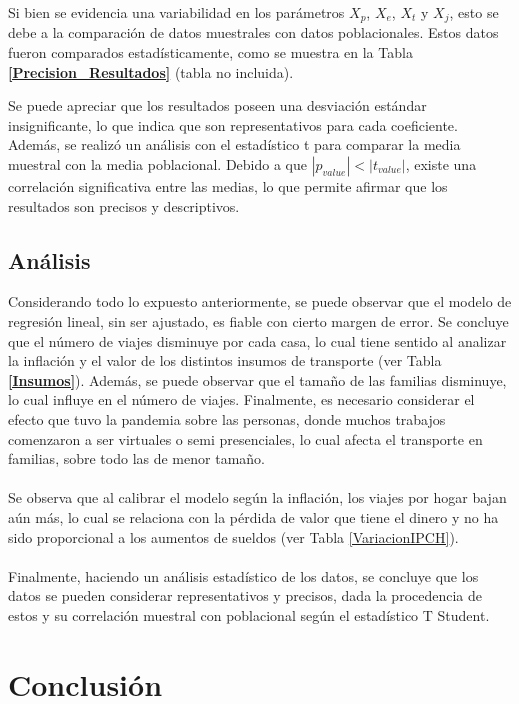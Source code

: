 \documentclass[12pt]{article} %
\begin{document}
Si bien se evidencia una variabilidad en los parámetros $X_p$, $X_e$, $X_t$ y $X_j$, esto se debe a la comparación de datos muestrales con datos poblacionales. Estos datos fueron comparados estadísticamente, como se muestra en la Tabla \textbf{\ref{Precision_Resultados}} (tabla no incluida).

Se puede apreciar que los resultados poseen una desviación estándar insignificante, lo que indica que son representativos para cada coeficiente. Además, se realizó un análisis con el estadístico t para comparar la media muestral con la media poblacional. Debido a que \(|p_{value}| < |t_{value}|\), existe una correlación significativa entre las medias, lo que permite afirmar que los resultados son precisos y descriptivos.

\subsection{Análisis}

Considerando todo lo expuesto anteriormente, se puede observar que el modelo de regresión lineal, sin ser ajustado, es fiable con cierto margen de error. Se concluye que el número de viajes disminuye por cada casa, lo cual tiene sentido al analizar la inflación y el valor de los distintos insumos de transporte (ver Tabla \textbf{\ref{Insumos}}). Además, se puede observar que el tamaño de las familias disminuye, lo cual influye en el número de viajes. Finalmente, es necesario considerar el efecto que tuvo la pandemia sobre las personas, donde muchos trabajos comenzaron a ser virtuales o semi presenciales, lo cual afecta el transporte en familias, sobre todo las de menor tamaño.
\\ \\
Se observa que al calibrar el modelo según la inflación, los viajes por hogar bajan aún más, lo cual se relaciona con la pérdida de valor que tiene el dinero y no ha sido proporcional a los aumentos de sueldos (ver Tabla \ref{VariacionIPCH}).
\\ \\
Finalmente, haciendo un análisis estadístico de los datos, se concluye que los datos se pueden considerar representativos y precisos, dada la procedencia de estos y su correlación muestral con poblacional según el estadístico T Student.

\section{Conclusión}
\end{document}
